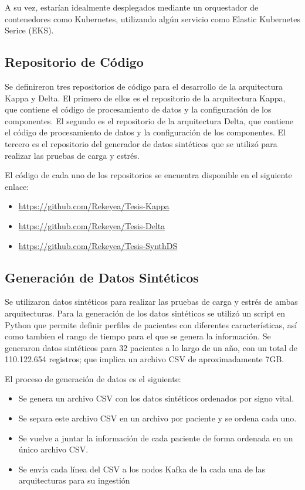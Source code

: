 A su vez, estarían idealmente desplegados mediante un orquestador de contenedores como Kubernetes, utilizando algún servicio como Elastic Kubernetes Serice (EKS).

\subsection{Repositorio de Código}

Se definireron tres repositorios de código para el desarrollo de la arquitectura Kappa y Delta.
El primero de ellos es el repositorio de la arquitectura Kappa, que contiene el código de procesamiento de datos y la configuración de los componentes.
El segundo es el repositorio de la arquitectura Delta, que contiene el código de procesamiento de datos y la configuración de los componentes.
El tercero es el repositorio del generador de datos sintéticos que se utilizó para realizar las pruebas de carga y estrés.

El código de cada uno de los repositorios se encuentra disponible en el siguiente enlace:

\begin{itemize}
    \item \url{https://github.com/Rekeyea/Tesis-Kappa}\\
    \item \url{https://github.com/Rekeyea/Tesis-Delta}\\
    \item \url{https://github.com/Rekeyea/Tesis-SynthDS}\\
\end{itemize}

\newpage

\subsection{Generación de Datos Sintéticos}

Se utilizaron datos sintéticos para realizar las pruebas de carga y estrés de ambas arquitecturas.
Para la generación de los datos sintéticos se utilizó un script en Python que permite definir perfiles de pacientes con diferentes características,
así como tambien el rango de tiempo para el que se genera la información.
Se generaron datos sintéticos para 32 pacientes a lo largo de un año, con un total de 110.122.654 registros;
que implica un archivo CSV de aproximadamente 7GB.

El proceso de generación de datos es el siguiente:
\begin{itemize}
    \item Se genera un archivo CSV con los datos sintéticos ordenados por signo vital.
    \item Se separa este archivo CSV en un archivo por paciente y se ordena cada uno.
    \item Se vuelve a juntar la información de cada paciente de forma ordenada en un único archivo CSV.
    \item Se envía cada línea del CSV a los nodos Kafka de la cada una de las arquitecturas para su ingestión
\end{itemize}


